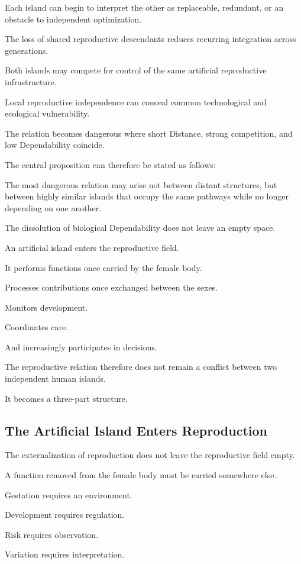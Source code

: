 Each island can begin to interpret the other as replaceable, redundant, or an obstacle to independent optimization.

The loss of shared reproductive descendants reduces recurring integration across generations.

Both islands may compete for control of the same artificial reproductive infrastructure.

Local reproductive independence can conceal common technological and ecological vulnerability.

The relation becomes dangerous where short Distance, strong competition, and low Dependability coincide.

The central proposition can therefore be stated as follows:

The most dangerous relation may arise not between distant structures, but between highly similar islands that occupy the same pathways while no longer depending on one another.

The dissolution of biological Dependability does not leave an empty space.

An artificial island enters the reproductive field.

It performs functions once carried by the female body.

Processes contributions once exchanged between the sexes.

Monitors development.

Coordinates care.

And increasingly participates in decisions.

The reproductive relation therefore does not remain a conflict between two independent human islands.

It becomes a three-part structure.

\subsection*{\textbf{The Artificial Island Enters Reproduction}} 

The externalization of reproduction does not leave the reproductive field empty.

A function removed from the female body must be carried somewhere else.

Gestation requires an environment.

Development requires regulation.

Risk requires observation.

Variation requires interpretation.

